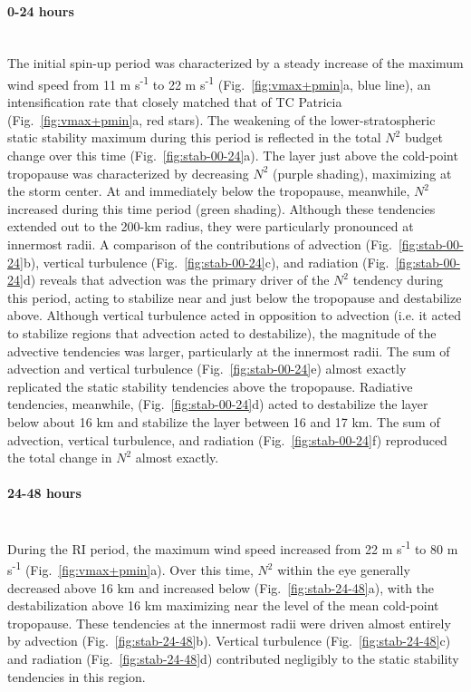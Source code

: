 \paragraph{0-24 hours}\mbox{}\\
\indent The initial spin-up period was characterized by a steady increase of the maximum wind speed from 11 m s\textsuperscript{-1} to 22 m s\textsuperscript{-1} (Fig.~\ref{fig:vmax+pmin}a, blue line), an intensification rate that closely matched that of TC Patricia (Fig.~\ref{fig:vmax+pmin}a, red stars).
The weakening of the lower-stratospheric static stability maximum during this period is reflected in the total $N^2$ budget change over this time (Fig.~\ref{fig:stab-00-24}a).
The layer just above the cold-point tropopause was characterized by decreasing $N^2$ (purple shading), maximizing at the storm center.
At and immediately below the tropopause, meanwhile, $N^2$ increased during this time period (green shading).
Although these tendencies extended out to the 200-km radius, they were particularly pronounced at innermost radii.
A comparison of the contributions of advection (Fig.~\ref{fig:stab-00-24}b), vertical turbulence (Fig.~\ref{fig:stab-00-24}c), and radiation (Fig.~\ref{fig:stab-00-24}d) reveals that advection was the primary driver of the $N^2$ tendency during this period, acting to stabilize near and just below the tropopause and destabilize above.
Although vertical turbulence acted in opposition to advection (i.e. it acted to stabilize regions that advection acted to destabilize), the magnitude of the advective tendencies was larger, particularly at the innermost radii.
The sum of advection and vertical turbulence (Fig.~\ref{fig:stab-00-24}e) almost exactly replicated the static stability tendencies above the tropopause.
Radiative tendencies, meanwhile, (Fig.~\ref{fig:stab-00-24}d) acted to destabilize the layer below about 16 km and stabilize the layer between 16 and 17 km.
The sum of advection, vertical turbulence, and radiation (Fig.~\ref{fig:stab-00-24}f) reproduced the total change in $N^2$ almost exactly.

\paragraph{24-48 hours}\mbox{}\\
\indent During the RI period, the maximum wind speed increased from 22 m s\textsuperscript{-1} to 80 m s\textsuperscript{-1} (Fig.~\ref{fig:vmax+pmin}a).
Over this time, $N^2$ within the eye generally decreased above 16 km and increased below (Fig.~\ref{fig:stab-24-48}a), with the destabilization above 16 km maximizing near the level of the mean cold-point tropopause.
These tendencies at the innermost radii were driven almost entirely by advection (Fig.~\ref{fig:stab-24-48}b).
Vertical turbulence (Fig.~\ref{fig:stab-24-48}c) and radiation (Fig.~\ref{fig:stab-24-48}d) contributed negligibly to the static stability tendencies in this region.

